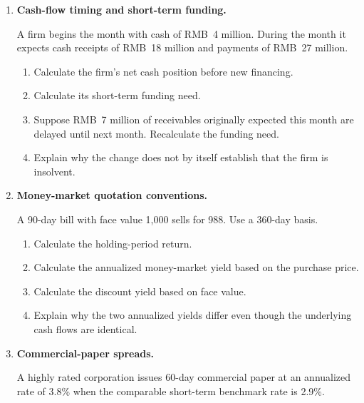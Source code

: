 
\begin{enumerate}

\item \textbf{Cash-flow timing and short-term funding.}

A firm begins the month with cash of RMB~4 million. During the month it expects cash receipts of RMB~18 million and payments of RMB~27 million.

\begin{enumerate}

\item Calculate the firm's net cash position before new financing.

\item Calculate its short-term funding need.

\item Suppose RMB~7 million of receivables originally expected this month are delayed until next month. Recalculate the funding need.

\item Explain why the change does not by itself establish that the firm is insolvent.

\end{enumerate}

\item \textbf{Money-market quotation conventions.}

A 90-day bill with face value 1,000 sells for 988. Use a 360-day basis.

\begin{enumerate}

\item Calculate the holding-period return.

\item Calculate the annualized money-market yield based on the purchase price.

\item Calculate the discount yield based on face value.

\item Explain why the two annualized yields differ even though the underlying cash flows are identical.

\end{enumerate}

\item \textbf{Commercial-paper spreads.}

A highly rated corporation issues 60-day commercial paper at an annualized rate of 3.8\% when the comparable short-term benchmark rate is 2.9\%.


\end{enumerate}

